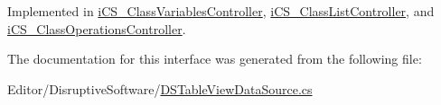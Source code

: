 Implemented in \hyperlink{classi_c_s___class_variables_controller_a4d4ab533337722d3259940ba68504af2}{i\+C\+S\+\_\+\+Class\+Variables\+Controller}, \hyperlink{classi_c_s___class_list_controller_a904383e4bd722a62dafa59f88487e129}{i\+C\+S\+\_\+\+Class\+List\+Controller}, and \hyperlink{classi_c_s___class_operations_controller_abf7cf96f6bebf93e2b475e9b93a77e2d}{i\+C\+S\+\_\+\+Class\+Operations\+Controller}.



The documentation for this interface was generated from the following file\+:\begin{DoxyCompactItemize}
\item 
Editor/\+Disruptive\+Software/\hyperlink{_d_s_table_view_data_source_8cs}{D\+S\+Table\+View\+Data\+Source.\+cs}\end{DoxyCompactItemize}
